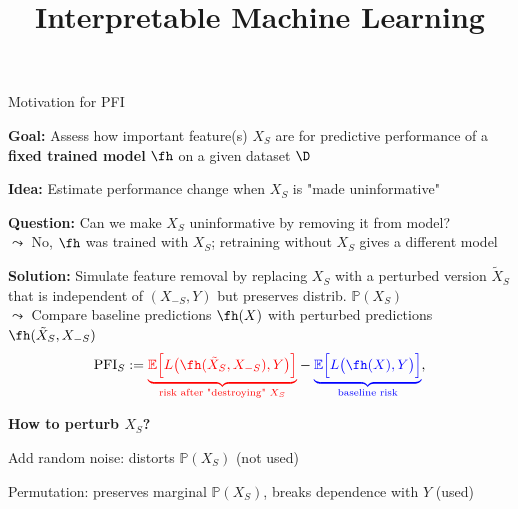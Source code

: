 \documentclass[10pt,compress,t,notes=noshow, xcolor=table]{beamer}
\title{Interpretable Machine Learning}
\begin{document}








\begin{framei}[align=top]{Motivation for PFI}
\item<1-> \textbf{Goal:} Assess how important feature(s) $X_S$ are for predictive performance of a \textbf{fixed trained model} $\fh$ on a given dataset $\D$
\item<1-> \textbf{Idea:} Estimate performance change when $X_S$ is "made uninformative"
\item<2-> \textbf{Question:} Can we make $X_S$ uninformative by removing it from model?\\
$\leadsto$ No, $\fh$ was trained with $X_S$; retraining without $X_S$ gives a different model
\item<3->
\textbf{Solution:} Simulate feature removal by replacing $X_S$ with a perturbed version $\tilde{X}_S$ that is independent of $(X_{-S}, Y)$ but preserves distrib. $\mathbb{P}(X_S)$\\
$\leadsto$ Compare {\color{blue}baseline predictions $\fh(X)$} with {\color{red}perturbed predictions $\fh(\tilde{X}_S, X_{-S})$}
$$
\text{PFI}_S :=
{\color{red}\underbrace{\mathbb{E}\Big[L\big(\fh(\tilde{X}_S, X_{-S}), Y\big)\Big]}_{\text{risk after "destroying" }X_S}}
-
{\color{blue}\underbrace{\mathbb{E}\Big[L\big(\fh(X), Y\big)\Big]}_{\text{baseline risk}}},
$$
\item<3-> \textbf{How to perturb $X_S$?}
\begin{itemizeS}
\item Add random noise: distorts $\mathbb{P}(X_S)$ (not used)
\item Permutation: preserves marginal $\mathbb{P}(X_S)$, breaks dependence with $Y$ (used)
\end{itemizeS}
\end{framei}
\end{document}
